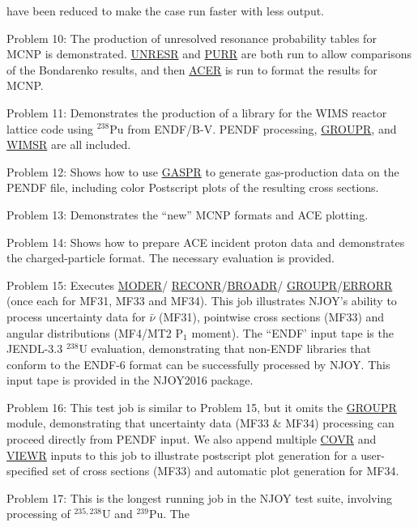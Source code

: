 \begin{description}
\begin{singlespace}
   have been reduced to make the case run faster with less output.
\item[Problem 10:] The production of unresolved resonance probability
   tables for MCNP is demonstrated.  \hyperlink{sUNRESRhy}{UNRESR}
   and \hyperlink{sPURRhy}{PURR} are both run to
   allow comparisons of the Bondarenko results, and then
   \hyperlink{sACERhy}{ACER} is
   run to format the results for MCNP.
\item[Problem 11:] Demonstrates the production of a library for the
   WIMS reactor lattice code using $^{238}$Pu from ENDF/B-V.  PENDF
   processing, \hyperlink{sGROUPRhy}{GROUPR}, and
   \hyperlink{sWIMSRhy}{WIMSR} are all included.
\item[Problem 12:]  Shows how to use \hyperlink{sGASPRhy}{GASPR}
   to generate gas-production
   data on the PENDF file, including color Postscript plots of the
   resulting cross sections.
\item[Problem 13:] Demonstrates the ``new'' MCNP formats and ACE
   plotting.
\item[Problem 14:] Shows how to prepare ACE incident proton
   data and demonstrates the charged-particle format.  The necessary
   evaluation is provided.
\item[Problem 15:]  Executes \hyperlink{sMODERhy}{MODER}/
   \hyperlink{sRECONRhy}{RECONR}/\hyperlink{sBROADRhy}{BROADR}/
   \hyperlink{sGROUPRhy}{GROUPR}/\hyperlink{sERRORRhy}{ERRORR}
   (once each for MF31, MF33 and MF34).  This job illustrates
   NJOY's ability
   to process uncertainty data for $\bar{\nu}$ (MF31), pointwise cross
   sections (MF33) and angular distributions (MF4/MT2 P$_1$ moment).
   The ``ENDF' input tape is the JENDL-3.3 $^{238}$U evaluation,
   demonstrating that non-ENDF libraries that conform to the ENDF-6
   format can be successfully processed by NJOY.  This input tape is
   provided in the NJOY2016 package.
\item[Problem 16:]  This test job is similar to Problem 15, but it
   omits the \hyperlink{sGROUPRhy}{GROUPR} module,
   demonstrating that uncertainty data
   (MF33 \& MF34) processing can proceed directly from PENDF input.
   We also append multiple \hyperlink{sCOVRhy}{COVR} and
   \hyperlink{sVIEWRhy}{VIEWR} inputs to this job to
   illustrate postscript plot generation for a user-specified set
   of cross sections (MF33) and automatic plot generation for MF34.
\item[Problem 17:]  This is the longest running job in the NJOY test
   suite, involving processing of $^{235,238}$U and $^{239}$Pu.  The

\end{singlespace}
\end{description}
